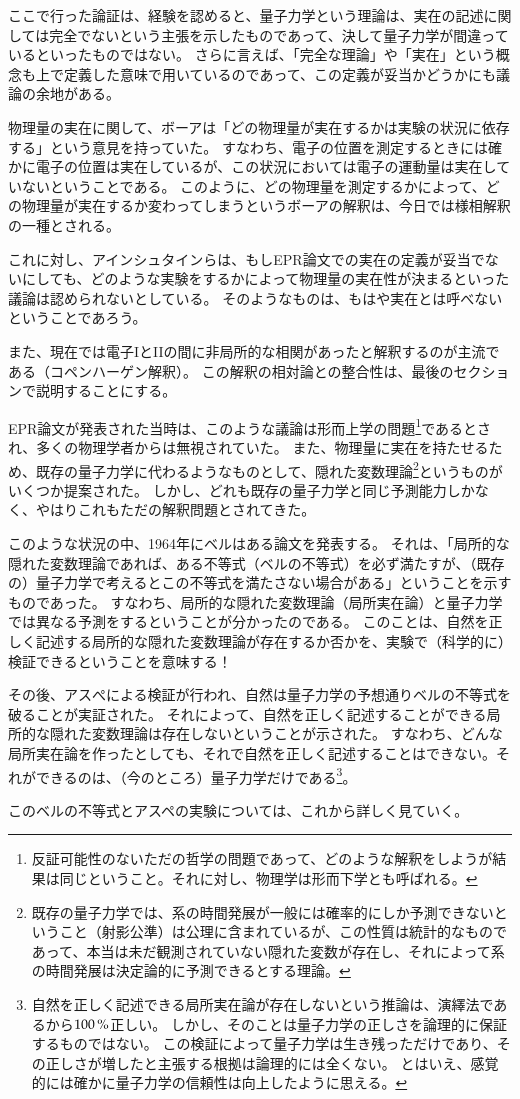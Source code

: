 \documentclass[10pt,b5paper,papersize,dvipdfmx]{jsbook}
\begin{document}
ここで行った論証は、経験を認めると、量子力学という理論は、実在の記述に関しては完全でないという主張を示したものであって、決して量子力学が間違っているといったものではない。
さらに言えば、「完全な理論」や「実在」という概念も上で定義した意味で用いているのであって、この定義が妥当かどうかにも議論の余地がある。\par
物理量の実在に関して、ボーアは「どの物理量が実在するかは実験の状況に依存する」という意見を持っていた。
すなわち、電子の位置を測定するときには確かに電子の位置は実在しているが、この状況においては電子の運動量は実在していないということである。
このように、どの物理量を測定するかによって、どの物理量が実在するか変わってしまうというボーアの解釈は、今日では様相解釈の一種とされる。\par
これに対し、アインシュタインらは、もしEPR論文での実在の定義が妥当でないにしても、どのような実験をするかによって物理量の実在性が決まるといった議論は認められないとしている。
そのようなものは、もはや実在とは呼べないということであろう。\par
また、現在では電子IとIIの間に非局所的な相関があったと解釈するのが主流である（コペンハーゲン解釈）。
この解釈の相対論との整合性は、最後のセクションで説明することにする。\par
EPR論文が発表された当時は、このような議論は形而上学の問題\footnote{
  反証可能性のないただの哲学の問題であって、どのような解釈をしようが結果は同じということ。それに対し、物理学は形而下学とも呼ばれる。
}であるとされ、多くの物理学者からは無視されていた。
また、物理量に実在を持たせるため、既存の量子力学に代わるようなものとして、隠れた変数理論\footnote{
  既存の量子力学では、系の時間発展が一般には確率的にしか予測できないということ（射影公準）は公理に含まれているが、この性質は統計的なものであって、本当は未だ観測されていない隠れた変数が存在し、それによって系の時間発展は決定論的に予測できるとする理論。
}というものがいくつか提案された。
しかし、どれも既存の量子力学と同じ予測能力しかなく、やはりこれもただの解釈問題とされてきた。\par
このような状況の中、1964年にベルはある論文を発表する。
それは、「局所的な隠れた変数理論であれば、ある不等式（ベルの不等式）を必ず満たすが、（既存の）量子力学で考えるとこの不等式を満たさない場合がある」ということを示すものであった。
すなわち、局所的な隠れた変数理論（局所実在論）と量子力学では異なる予測をするということが分かったのである。
このことは、自然を正しく記述する局所的な隠れた変数理論が存在するか否かを、実験で（科学的に）検証できるということを意味する！ \par
その後、アスぺによる検証が行われ、自然は量子力学の予想通りベルの不等式を破ることが実証された。
それによって、自然を正しく記述することができる局所的な隠れた変数理論は存在しないということが示された。
すなわち、どんな局所実在論を作ったとしても、それで自然を正しく記述することはできない。それができるのは、（今のところ）量子力学だけである\footnote{
  自然を正しく記述できる局所実在論が存在しないという推論は、演繹法であるから$100\tani{\%}$正しい。
  しかし、そのことは量子力学の正しさを論理的に保証するものではない。
  この検証によって量子力学は生き残っただけであり、その正しさが増したと主張する根拠は論理的には全くない。
  とはいえ、感覚的には確かに量子力学の信頼性は向上したように思える。
}。\par
このベルの不等式とアスペの実験については、これから詳しく見ていく。
\end{document}
